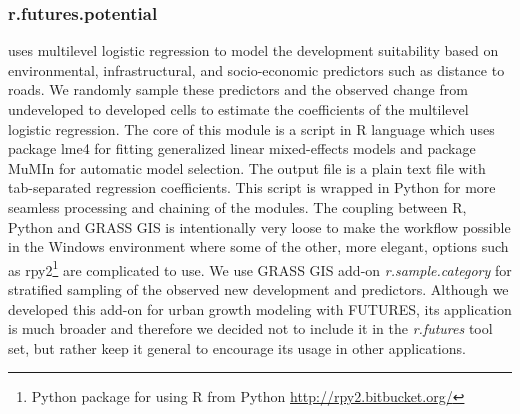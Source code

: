\documentclass{isprs}
\begin{document}
\subsubsection{r.futures.potential}
uses multilevel logistic regression  to model the development
suitability based on environmental, infrastructural, and socio-economic predictors such as distance to roads.
We randomly sample these predictors and the observed change from undeveloped to developed cells
to estimate the coefficients of the multilevel logistic regression.
The core of this
module is a script in R language \cite{rstats} which uses package lme4 \cite{lme4}
for fitting generalized linear mixed-effects models and package MuMIn \cite{mumin}
for automatic model selection.
The output file is a plain text file with tab-separated regression coefficients.
This script is wrapped in Python for more seamless processing
and chaining of the modules. 
The coupling between R, Python and GRASS GIS
is intentionally very loose to make the workflow possible in the Windows environment
where some of the other, more elegant, options such as
rpy2\footnote{Python package for using R from Python \url{http://rpy2.bitbucket.org/}} are complicated to use.
We use GRASS GIS add-on \emph{r.sample.category} for stratified sampling of the observed new development and predictors.
Although we developed this add-on for urban growth modeling with FUTURES,
its application is much broader and therefore we decided not to include
it in the \emph{r.futures} tool set, but rather keep it general to encourage its usage
in other applications.
\end{document}
